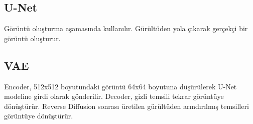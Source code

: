 \subsection{U-Net}
Görüntü oluşturma aşamasında kullanılır. Gürültüden yola çıkarak gerçekçi bir görüntü oluşturur. 

\subsection{VAE}
Encoder, 512x512 boyutundaki görüntü 64x64 boyutuna düşürülerek U-Net modeline girdi olarak gönderilir. Decoder, gizli temsili tekrar görüntüye dönüştürür. Reverse Diffusion sonrası üretilen gürültüden arındırılmış temsilleri görüntüye dönüştürür.

\newpage